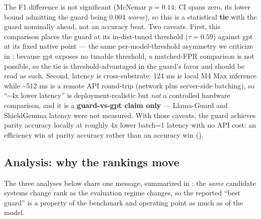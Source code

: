 \documentclass[sigconf,nonacm]{acmart}
\begin{document}
The F1 difference is not significant (McNemar $p=0.14$; CI spans zero, its lower bound admitting the guard being 0.004 \emph{worse}), so this is a statistical \textbf{tie} with the guard nominally ahead, not an accuracy beat. Two caveats. First, this comparison places the guard at its in-dist-tuned threshold ($\tau=0.59$) against gpt at its fixed native point --- the same per-model-threshold asymmetry we criticize in ; because gpt exposes no tunable threshold, a matched-FPR comparison is not possible, so the tie is threshold-advantaged in the guard's favor and should be read as such. Second, latency is cross-substrate: 124 ms is local M4 Max inference while \textasciitilde{}512 ms is a remote API round-trip (network plus server-side batching), so ``\textasciitilde{}4x lower latency'' is deployment-realistic but \emph{not} a controlled hardware comparison, and it is a \textbf{guard-vs-gpt claim only} --- Llama-Guard and ShieldGemma latency were not measured. With those caveats, the guard achieves parity accuracy locally at roughly 4x lower batch=1 latency with no API cost: an efficiency win at parity accuracy rather than an accuracy win ().

\subsection{Analysis: why the rankings move}
\label{sec:analysis}

The three analyses below share one message, summarized in : the \emph{same} candidate systems change rank as the evaluation regime changes, so the reported ``best guard'' is a property of the benchmark and operating point as much as of the model.
\end{document}
